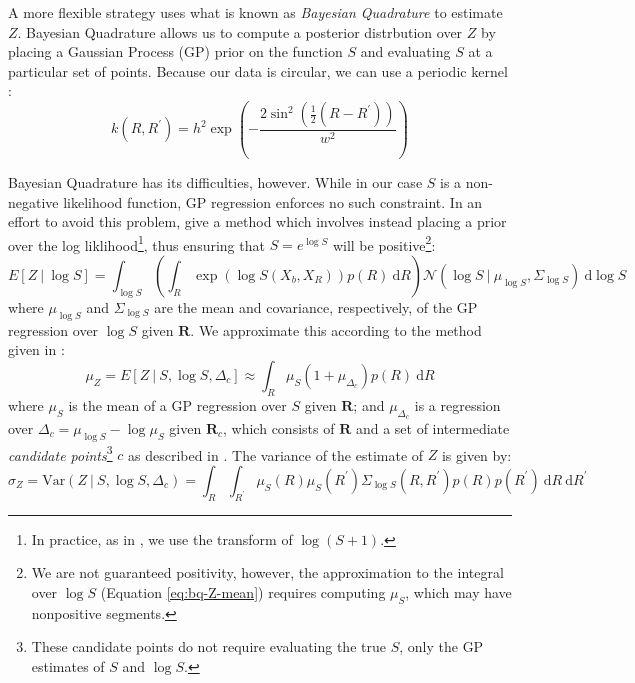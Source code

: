\documentclass{article} %
\begin{document}
A more flexible strategy uses what is known as \emph{Bayesian
  Quadrature} \cite{Diaconis:1988uo,OHagan:1991tx} to estimate $Z$.
Bayesian Quadrature allows us to compute a posterior distrbution over
$Z$ by placing a Gaussian Process (GP) prior on the function $S$ and
evaluating $S$ at a particular set of points. Because our data is
circular, we can use a periodic kernel \cite{Rasmussen:2006vz}:
\begin{equation}
k(R, R^\prime)=h^2\exp\left(-\frac{2\sin^2\left(\frac{1}{2}(R-R^\prime)\right)}{w^2}\right)
\end{equation}

Bayesian Quadrature has its difficulties, however. While in our case
$S$ is a non-negative likelihood function, GP regression enforces no
such constraint. In an effort to avoid this problem,
\cite{Osborne:2012tm} give a method which involves instead placing a
prior over the log liklihood\footnote{In practice, as in
  \cite{Osborne:2012tm}, we use the transform of $\log(S+1)$.}, thus
ensuring that $S=e^{\log S}$ will be positive\footnote{We are not
  guaranteed positivity, however, the approximation to the integral
  over $\log S$ (Equation \ref{eq:bq-Z-mean}) requires computing
  $\mu_S$, which may have nonpositive segments.}:
\begin{equation*}
  E[Z\ \vert \ \log S]=\int_{\log S}\left(\int_R \exp(\log{S(X_b,X_R)})p(R)\ \mathrm{d}R\right)\mathcal{N}\left(\log{S}\ \vert \ \mu_{\log S}, \Sigma_{\log S}\right)\ \mathrm{d}\log S
\end{equation*}
where $\mu_{\log S}$ and $\Sigma_{\log S}$ are the mean and
covariance, respectively, of the GP regression over $\log S$ given
$\mathbf{R}$. We approximate this according to the method given in
\cite{Osborne:2012tm}:
\begin{equation}
  \mu_Z=E[Z\ \vert \ S, \log S, \Delta_c] \approx \int_R \mu_{S}(1 + \mu_{\Delta_c}) p(R)\ \mathrm{d}R 
  \label{eq:bq-Z-mean}
\end{equation}
where $\mu_S$ is the mean of a GP regression over $S$ given
$\mathbf{R}$; and $\mu_{\Delta_c}$ is a regression over
$\Delta_c=\mu_{\log S} - \log \mu_S$ given $\mathbf{R}_c$, which
consists of $\mathbf{R}$ and a set of intermediate \emph{candidate
  points}\footnote{These candidate points do not require evaluating
  the true $S$, only the GP estimates of $S$ and $\log S$.} $c$ as
described in \cite{Osborne:2012tm}. The variance of the estimate of
$Z$ is given by:
\begin{equation}
  \sigma_Z=\mathrm{Var}(Z\ \vert \ S, \log S, \Delta_c) = \int_R\int_{R^\prime} \mu_S(R)\mu_S(R^\prime) \Sigma_{\log S}(R, R^\prime)p(R)p(R^\prime)\ \mathrm{d}R\ \mathrm{d}R^\prime
  \label{eq:bq-Z-var}
\end{equation}
\end{document}
